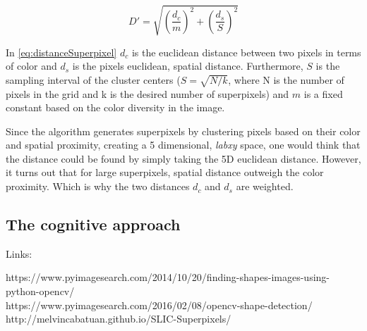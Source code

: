 \begin{equation}
	D'=\sqrt{\left(\frac{d_{c}}{m}\right)^{2} + \left(\frac{d_{s}}{S}\right)^{2}}
	\label{eq:distanceSuperpixel}
\end{equation}

In \autoref{eq:distanceSuperpixel} $d_{c}$ is the euclidean distance between two pixels in terms of color and $d_{s}$ is the pixels euclidean, spatial distance. Furthermore, $S$ is the sampling interval of the cluster centers ($S = \sqrt{N/k}$, where N is the number of pixels in the grid and k is the desired number of superpixels) and $m$ is a fixed constant based on the color diversity in the image.

Since the algorithm generates superpixels by clustering pixels based on their color and spatial proximity, creating a 5 dimensional, \textit{labxy} space, one would think that the distance could be found by simply taking the 5D euclidean distance. However, it turns out that for large superpixels, spatial distance outweigh the color proximity. Which is why the two distances $d_{c}$ and $d_{s}$ are weighted.

\subsection{The cognitive approach}

Links:

https://www.pyimagesearch.com/2014/10/20/finding-shapes-images-using-python-opencv/\\
https://www.pyimagesearch.com/2016/02/08/opencv-shape-detection/
\\
http://melvincabatuan.github.io/SLIC-Superpixels/
\\
